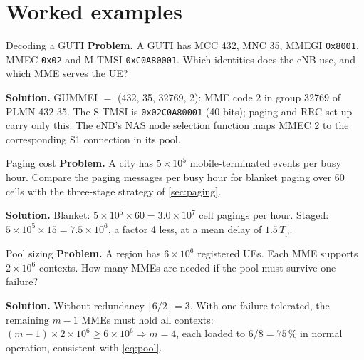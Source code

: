 \documentclass[11pt,a4paper]{article}
\begin{document}
\section{Worked examples}

\begin{examplebox}{Decoding a GUTI}\label{ex:guti}
\textbf{Problem.} A GUTI has MCC 432, MNC 35, MMEGI \texttt{0x8001}, MMEC \texttt{0x02} and M-TMSI
\texttt{0xC0A80001}. Which identities does the eNB use, and which MME serves the UE?

\textbf{Solution.} GUMMEI $=$ (432, 35, 32769, 2): MME code 2 in group 32769 of PLMN 432-35. The S-TMSI is
\texttt{0x02C0A80001} (40 bits); paging and RRC set-up carry only this. The eNB's NAS node selection
function maps MMEC 2 to the corresponding S1 connection in its pool.
\end{examplebox}

\begin{examplebox}{Paging cost}\label{ex:paging}
\textbf{Problem.} A city has $5\times10^5$ mobile-terminated events per busy hour. Compare the paging
messages per busy hour for blanket paging over 60 cells with the three-stage strategy of \cref{sec:paging}.

\textbf{Solution.} Blanket: $5\times10^5\times60 = 3.0\times10^7$ cell pagings per hour. Staged:
$5\times10^5\times15 = 7.5\times10^6$, a factor 4 less, at a mean delay of $1.5\,T_\mathrm{p}$.
\end{examplebox}

\begin{examplebox}{Pool sizing}\label{ex:pool}
\textbf{Problem.} A region has $6\times10^6$ registered UEs. Each MME supports $2\times10^6$ contexts. How many
MMEs are needed if the pool must survive one failure?

\textbf{Solution.} Without redundancy $\lceil 6/2\rceil = 3$. With one failure tolerated, the remaining $m-1$
MMEs must hold all contexts: $(m-1)\times2\times10^6 \ge 6\times10^6 \Rightarrow m = 4$, each loaded to
$6/8 = 75\,\%$ in normal operation, consistent with \cref{eq:pool}.
\end{examplebox}

\end{document}
